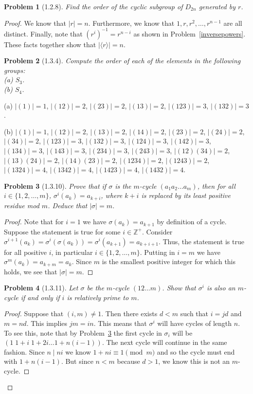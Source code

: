 \documentclass{article}
\newtheorem{problem}{Problem}
\begin{document}
\begin{problem}[1.2.8]
Find the order of the cyclic subgroup of $D_{2n}$ generated by $r$.
\end{problem}
\begin{proof}
We know that $|r| = n$. Furthermore, we know that $1, r, r^2, \dots, r^{n-1}$ are all distinct. Finally, note that $(r^i)^{-1} = r^{n-i}$ as shown in Problem~\ref{inversepowers}. These facts together show that $|\langle r \rangle | = n$.

\begin{problem}[1.3.4]
\label{symmetricorders}
Compute the order of each of the elements in the following groups:\\
(a) $S_3$.\\
(b) $S_4$.
\end{problem}

(a) $|(1)| = 1$, $|(12)| = 2$, $|(23)| = 2$, $|(13)| = 2$, $|(123)| = 3$, $|(132)| = 3$.

(b) $|(1)| = 1$, $|(12)| = 2$, $|(13)| = 2$, $|(14)| = 2$, $|(23)| = 2$, $|(24)| = 2$, $|(34)| = 2$, $|(123)| = 3$, $|(132)| = 3$, $|(124)| = 3$, $|(142)| = 3$, $|(134)| = 3$, $|(143)| = 3$, $|(234)| = 3$, $|(243)| = 3$, $|(12)(34)| = 2$, $|(13)(24)| = 2$, $|(14)(23)| = 2$, $|(1234)| = 2$, $|(1243)| = 2$, $|(1324)| = 4$, $|(1342)| = 4$, $|(1423)| = 4$, $|(1432)| = 4$.

\begin{problem}[1.3.10]
\label{cyclepowers}
Prove that if $\sigma$ is the $m$-cycle $(a_1 a_2 \dots a_m)$, then for all $i \in \{1, 2, \dots , m\}$, $\sigma^i(a_k) = a_{k+i}$, where $k+i$ is replaced by its least positive residue mod $m$. Deduce that $|\sigma| = m$.
\end{problem}
\begin{proof}
Note that for $i = 1$ we have $\sigma(a_k) = a_{k+1}$ by definition of a cycle. Suppose the statement is true for some $i \in \mathbb{Z}^+$. Consider $\sigma^{i+1} (a_k) = \sigma^i(\sigma(a_k)) = \sigma^i(a_{k+1}) = a_{k+i+1}$. Thus, the statement is true for all positive $i$, in particular $i \in \{1, 2, \dots , m\}$. Putting in $i = m$ we have $\sigma^m(a_k) = a_{k+m} = a_k$. Since $m$ is the smallest positive integer for which this holds, we see that $|\sigma| = m$.
\end{proof}

\begin{problem}[1.3.11]
Let $\sigma$ be the $m$-cycle $(1 2 \dots m)$. Show that $\sigma^i$ is also an $m$-cycle if and only if $i$ is relatively prime to $m$.
\end{problem}
\begin{proof}
Suppose that $(i,m) \neq 1$. Then there exists $d < m$ such that $i = jd$ and $m = nd$. This implies $jm = in$. This means that $\sigma^i$ will have cycles of length $n$. To see this, note that by Problem~\ref{cyclepowers} the first cycle in $\sigma_i$ will be $(1 \; 1 + i \; 1 + 2i \dots 1 + n(i-1))$. The next cycle will continue in the same fashion. Since $n \mid ni$ we know $1 + ni \equiv 1 \pmod{m}$ and so the cycle must end with $1 + n(i-1)$. But since $n < m$ because $d > 1$, we know this is not an $m$-cycle.


\end{proof}
\end{proof}
\end{document}
